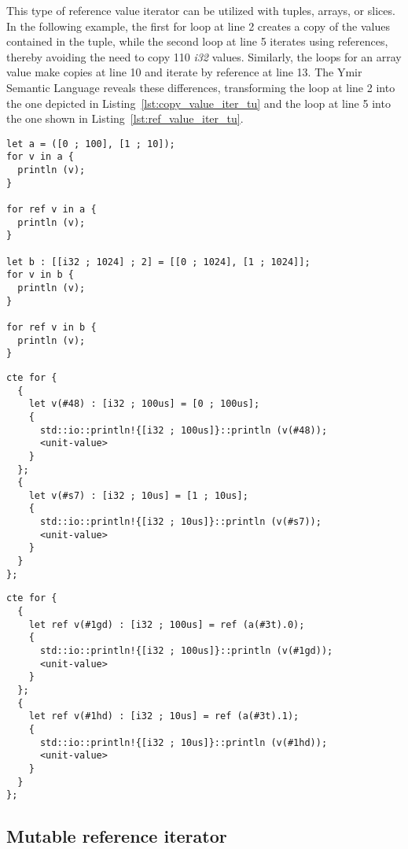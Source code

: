 This type of reference value iterator can be utilized with tuples, arrays, or
slices. In the following example, the first for loop at line 2 creates a copy of
the values contained in the tuple, while the second loop at line 5 iterates
using references, thereby avoiding the need to copy 110 \textit{i32} values.
Similarly, the loops for an array value make copies at line 10 and iterate by
reference at line 13. The Ymir Semantic Language reveals these differences,
transforming the loop at line 2 into the one depicted in
Listing~\ref{lst:copy_value_iter_tu} and the loop at line 5 into the one shown
in Listing~\ref{lst:ref_value_iter_tu}.

\begin{lstlisting}[style=coloredverbatim, caption=iteration using reference value iterator, label=lst:ref_value_iter_ex]
let a = ([0 ; 100], [1 ; 10]);
for v in a {
  println (v);
}

for ref v in a {
  println (v);
}

let b : [[i32 ; 1024] ; 2] = [[0 ; 1024], [1 ; 1024]];
for v in b {
  println (v);
}

for ref v in b {
  println (v);
}
\end{lstlisting}

\begin{lstlisting}[style=myilVerb, caption=By copy iteration on a tuple, label=lst:copy_value_iter_tu]
cte for {
  {
    let v(#48) : [i32 ; 100us] = [0 ; 100us];
    {
      std::io::println!{[i32 ; 100us]}::println (v(#48));
      <unit-value>
    }
  };
  {
    let v(#s7) : [i32 ; 10us] = [1 ; 10us];
    {
      std::io::println!{[i32 ; 10us]}::println (v(#s7));
      <unit-value>
    }
  }
};
\end{lstlisting}

\begin{lstlisting}[style=myilVerb, caption=By reference iteration on a tuple, label=lst:ref_value_iter_tu]
cte for {
  {
    let ref v(#1gd) : [i32 ; 100us] = ref (a(#3t).0);
    {
      std::io::println!{[i32 ; 100us]}::println (v(#1gd));
      <unit-value>
    }
  };
  {
    let ref v(#1hd) : [i32 ; 10us] = ref (a(#3t).1);
    {
      std::io::println!{[i32 ; 10us]}::println (v(#1hd));
      <unit-value>
    }
  }
};
\end{lstlisting}

\subsection{Mutable reference iterator}

